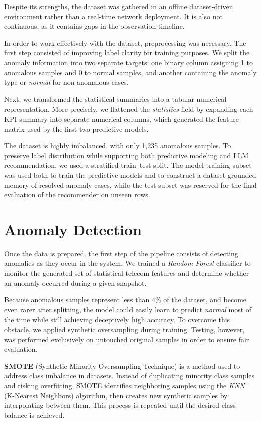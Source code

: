 Despite its strengths, the dataset was gathered in an offline dataset-driven environment rather than a real-time network deployment. It is also not continuous, as it contains gaps in the observation timeline.

In order to work effectively with the dataset, preprocessing was necessary. The first step consisted of improving label clarity for training purposes. We split the anomaly information into two separate targets: one binary column assigning 1 to anomalous samples and 0 to normal samples, and another containing the anomaly type or \textit{normal} for non-anomalous cases.

Next, we transformed the statistical summaries into a tabular numerical representation. More precisely, we flattened the \textit{statistics} field by expanding each KPI summary into separate numerical columns, which generated the feature matrix used by the first two predictive models.

The dataset is highly imbalanced, with only 1,235 anomalous samples. To preserve label distribution while supporting both predictive modeling and LLM recommendation, we used a stratified train--test split. The model-training subset was used both to train the predictive models and to construct a dataset-grounded memory of resolved anomaly cases, while the test subset was reserved for the final evaluation of the recommender on unseen rows.

\section{Anomaly Detection}

Once the data is prepared, the first step of the pipeline consists of detecting anomalies as they occur in the system. We trained a \textit{Random Forest} classifier to monitor the generated set of statistical telecom features and determine whether an anomaly occurred during a given snapshot.

Because anomalous samples represent less than 4\% of the dataset, and become even rarer after splitting, the model could easily learn to predict \textit{normal} most of the time while still achieving deceptively high accuracy. To overcome this obstacle, we applied synthetic oversampling during training. Testing, however, was performed exclusively on untouched original samples in order to ensure fair evaluation.

\textbf{SMOTE} (Synthetic Minority Oversampling Technique) is a method used to address class imbalance in datasets. Instead of duplicating minority class samples and risking overfitting, SMOTE identifies neighboring samples using the \textit{KNN} (K-Nearest Neighbors) algorithm, then creates new synthetic samples by interpolating between them. This process is repeated until the desired class balance is achieved.

